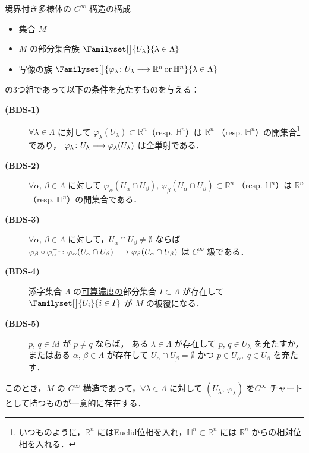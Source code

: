 \documentclass[TQFT_main]{subfiles}
\begin{document}
\begin{mylem}[label=lem:cinfty-chart-b]{境界付き多様体の $C^\infty$ 構造の構成}
	\begin{itemize}
		\item \underline{集合} $M$
		\item $M$ の部分集合族 $\Familyset[\big]{U_\lambda}{\lambda \in \Lambda}$
		\item 写像の族 $\Familyset[\big]{\varphi_\lambda \colon U_\lambda \lto \mathbb{R}^n\, \mathrm{or}\, \mathbb{H}^n}{\lambda \in \Lambda}$
	\end{itemize}
	の3つ組であって以下の条件を充たすものを与える：
	\begin{description}
		\item[\textbf{(BDS-1)}]  $\forall \lambda \in \Lambda$ に対して 
		$\varphi_\lambda (U_\lambda) \subset \mathbb{R}^n$（resp. $\mathbb{H}^n$）は $\mathbb{R}^n$ （resp. $\mathbb{H}^n$）の開集合\footnote{いつものように，$\mathbb{R}^n$ にはEuclid位相を入れ，$\mathbb{H}^n \subset \mathbb{R}^n$ には $\mathbb{R}^n$ からの相対位相を入れる．}であり，
		$\varphi_\lambda \colon U_\lambda \longrightarrow \varphi_\lambda (U_\lambda)$
		は全単射である．
		\item[\textbf{(BDS-2)}]  $\forall \alpha,\, \beta \in \Lambda$ に対して $\varphi_\alpha (U_\alpha \cap U_\beta),\, \varphi_\beta (U_\alpha \cap U_\beta) \subset \mathbb{R}^n$ （resp. $\mathbb{H}^n$）は $\mathbb{R}^n$ （resp. $\mathbb{H}^n$）の開集合である．
		\item[\textbf{(BDS-3)}]  $\forall \alpha,\, \beta \in \Lambda$ に対して，$U_\alpha \cap U_\beta \neq \emptyset$ ならば $\varphi_\beta \circ \varphi_\alpha^{-1} \colon \varphi_\alpha (U_\alpha \cap U_\beta) \longrightarrow \varphi_\beta (U_\alpha \cap U_\beta)$ は $C^\infty$ 級である．
		\item[\textbf{(BDS-4)}]  添字集合 $\Lambda$ の\underline{可算濃度の}部分集合 $I \subset \Lambda$ が存在して
		$\Familyset[\big]{U_i}{i \in I}$ が $M$ の被覆になる．
		\item[\textbf{(BDS-5)}]  $p,\, q \in M$ が $p \neq q$ ならば，
		ある $\lambda \in \Lambda$ が存在して $p,\, q \in U_\lambda$ を充たすか，
		またはある $\alpha,\, \beta \in \Lambda$ が存在して $U_\alpha \cap U_\beta = \emptyset$ かつ $p \in U_\alpha,\; q \in U_\beta$ を充たす．
	\end{description}
	このとき，$M$ の $C^\infty$ 構造であって，$\forall \lambda \in \Lambda$ に対して $(U_\lambda,\, \varphi_\lambda)$ を\hyperref[diffmani]{$C^\infty$ チャート}として持つものが一意的に存在する．
\end{mylem}
\end{document}
